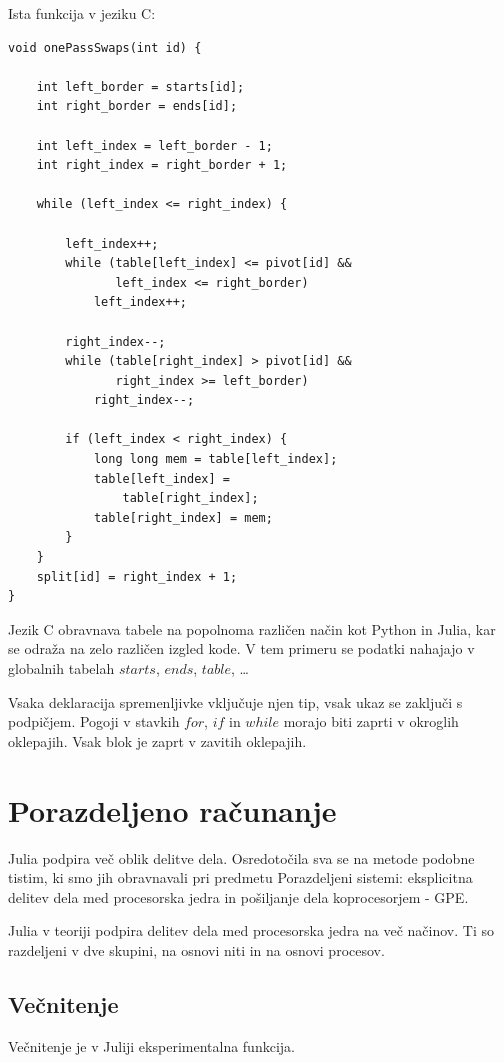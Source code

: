 \documentclass[journal,a4paper,twoside]{sty/IEEEtran}
\begin{document}
Ista funkcija v jeziku C:
\begin{lstlisting}
void onePassSwaps(int id) {

    int left_border = starts[id];
    int right_border = ends[id];

    int left_index = left_border - 1;
    int right_index = right_border + 1;

    while (left_index <= right_index) {

        left_index++;
        while (table[left_index] <= pivot[id] &&
               left_index <= right_border)
            left_index++;

        right_index--;
        while (table[right_index] > pivot[id] &&
               right_index >= left_border)
            right_index--;

        if (left_index < right_index) {
            long long mem = table[left_index];
            table[left_index] =
                table[right_index];
            table[right_index] = mem;
        }
    }
    split[id] = right_index + 1;
}
\end{lstlisting}

Jezik C obravnava tabele na popolnoma različen način kot Python in Julia, kar se odraža na zelo različen izgled kode.
V tem primeru se podatki nahajajo v globalnih tabelah $starts$, $ends$, $table$, \ldots

Vsaka deklaracija spremenljivke vključuje njen tip, vsak ukaz se zaključi s podpičjem.
Pogoji v stavkih $for$, $if$ in $while$ morajo biti zaprti v okroglih oklepajih.
Vsak blok je zaprt v zavitih oklepajih.

\section{Porazdeljeno računanje}

Julia podpira več oblik delitve dela.
Osredotočila sva se na metode podobne tistim, ki smo jih obravnavali pri predmetu Porazdeljeni sistemi: eksplicitna delitev dela med procesorska jedra in
	pošiljanje dela koprocesorjem - GPE.

Julia v teoriji podpira delitev dela med procesorska jedra na več načinov.
Ti so razdeljeni v dve skupini, na osnovi niti in na osnovi procesov.

\subsection{Večnitenje}

Večnitenje je v Juliji eksperimentalna funkcija.
\end{document}

